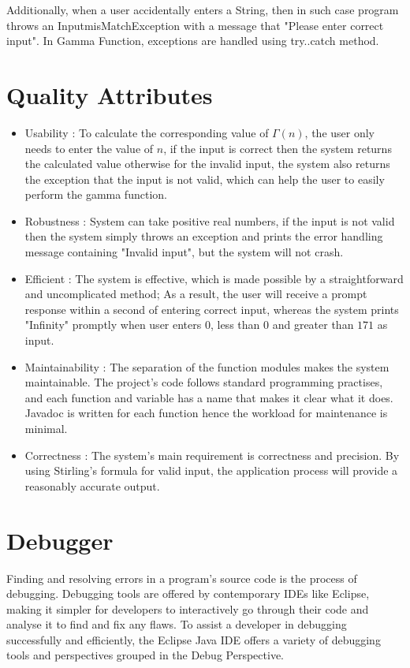 \documentclass[12pt,a4paper]{report}
\begin{document}
Additionally, when a user accidentally enters a String, then in such case program throws an InputmisMatchException with a message that "Please enter correct input". In Gamma Function, exceptions are handled using try..catch method.\\

\section{Quality Attributes}
\begin{itemize}
    \item{Usability : To calculate the corresponding value of $\Gamma \left( n \right)$, the user only needs to enter the value of $n$, if the input is correct then the system returns the calculated value otherwise for the invalid input, the system also returns the exception that the input is not valid, which can help the user to easily perform the gamma function.}
    
    \item{Robustness : System can take positive real numbers, if the input is not valid then the system simply throws an exception and prints the error handling message containing "Invalid input", but the system will not crash. }
    
    \item{Efficient : The system is effective, which is made possible by a straightforward and uncomplicated method; As a result, the user will receive a prompt response within a second of entering correct input, whereas the system prints "Infinity" promptly when user enters $0$, less than $0$ and greater than $171$ as input. }
    
    \item{Maintainability : The separation of the function modules makes the system maintainable. The project's code follows standard programming practises, and each function and variable has a name that makes it clear what it does. Javadoc is written for each function hence the workload for maintenance is minimal.}
    
    \item{Correctness : The system's main requirement is correctness and precision. By using Stirling's formula for valid input, the application process will provide a reasonably accurate output.}
\end{itemize}

\newpage

\section{Debugger}
Finding and resolving errors in a program's source code is the process of debugging. Debugging tools are offered by contemporary IDEs like Eclipse, making it simpler for developers to interactively go through their code and analyse it to find and fix any flaws. To assist a developer in debugging successfully and efficiently, the Eclipse Java IDE offers a variety of debugging tools and perspectives grouped in the Debug Perspective.
\end{document}
